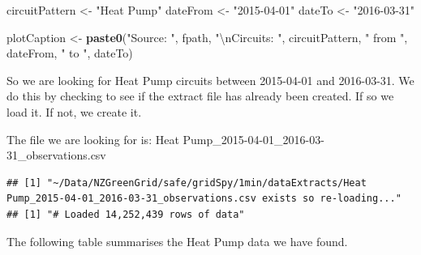 \documentclass[]{article}
\newenvironment{Shaded}{\begin{snugshade}}{\end{snugshade}}
\newcommand{\KeywordTok}[1]{\textcolor[rgb]{0.13,0.29,0.53}{\textbf{#1}}}
\newcommand{\CharTok}[1]{\textcolor[rgb]{0.31,0.60,0.02}{#1}}
\newcommand{\StringTok}[1]{\textcolor[rgb]{0.31,0.60,0.02}{#1}}
\newcommand{\NormalTok}[1]{#1}
\begin{document}
\begin{Shaded}
\begin{Highlighting}[]
\NormalTok{circuitPattern <-}\StringTok{ "Heat Pump"}
\NormalTok{dateFrom <-}\StringTok{ "2015-04-01"}
\NormalTok{dateTo <-}\StringTok{ "2016-03-31"}

\NormalTok{plotCaption <-}\StringTok{ }\KeywordTok{paste0}\NormalTok{(}\StringTok{"Source: "}\NormalTok{, fpath,}
                      \StringTok{"}\CharTok{\textbackslash{}n}\StringTok{Circuits: "}\NormalTok{, circuitPattern, }\StringTok{" from "}\NormalTok{, dateFrom, }\StringTok{" to "}\NormalTok{, dateTo)}
\end{Highlighting}
\end{Shaded}

So we are looking for Heat Pump circuits between 2015-04-01 and
2016-03-31. We do this by checking to see if the extract file has
already been created. If so we load it. If not, we create it.

The file we are looking for is: Heat
Pump\_2015-04-01\_2016-03-31\_observations.csv

\begin{verbatim}
## [1] "~/Data/NZGreenGrid/safe/gridSpy/1min/dataExtracts/Heat Pump_2015-04-01_2016-03-31_observations.csv exists so re-loading..."
## [1] "# Loaded 14,252,439 rows of data"
\end{verbatim}

The following table summarises the Heat Pump data we have found.
\end{document}
